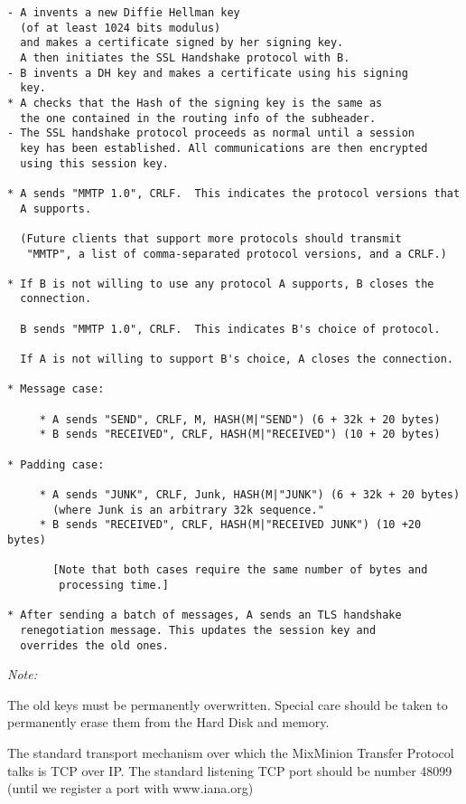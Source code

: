 \begin{verbatim}
- A invents a new Diffie Hellman key 
  (of at least 1024 bits modulus)
  and makes a certificate signed by her signing key.
  A then initiates the SSL Handshake protocol with B.
- B invents a DH key and makes a certificate using his signing
  key.
* A checks that the Hash of the signing key is the same as
  the one contained in the routing info of the subheader.
- The SSL handshake protocol proceeds as normal until a session
  key has been established. All communications are then encrypted
  using this session key.

* A sends "MMTP 1.0", CRLF.  This indicates the protocol versions that
  A supports.

  (Future clients that support more protocols should transmit
   "MMTP", a list of comma-separated protocol versions, and a CRLF.)

* If B is not willing to use any protocol A supports, B closes the 
  connection.

  B sends "MMTP 1.0", CRLF.  This indicates B's choice of protocol.

  If A is not willing to support B's choice, A closes the connection.

* Message case:

     * A sends "SEND", CRLF, M, HASH(M|"SEND") (6 + 32k + 20 bytes)
     * B sends "RECEIVED", CRLF, HASH(M|"RECEIVED") (10 + 20 bytes)

* Padding case:

     * A sends "JUNK", CRLF, Junk, HASH(M|"JUNK") (6 + 32k + 20 bytes)
       (where Junk is an arbitrary 32k sequence."
     * B sends "RECEIVED", CRLF, HASH(M|"RECEIVED JUNK") (10 +20 bytes)

       [Note that both cases require the same number of bytes and 
        processing time.]

* After sending a batch of messages, A sends an TLS handshake
  renegotiation message. This updates the session key and
  overrides the old ones.

\end{verbatim}

\emph{Note:}

The old keys must be permanently overwritten. Special care should be
taken to permanently erase them from the Hard Disk and memory. 

The standard transport mechanism over which the MixMinion Transfer
Protocol talks is TCP over IP. The standard listening TCP port should be 
number 48099 (until we register a port with www.iana.org)

